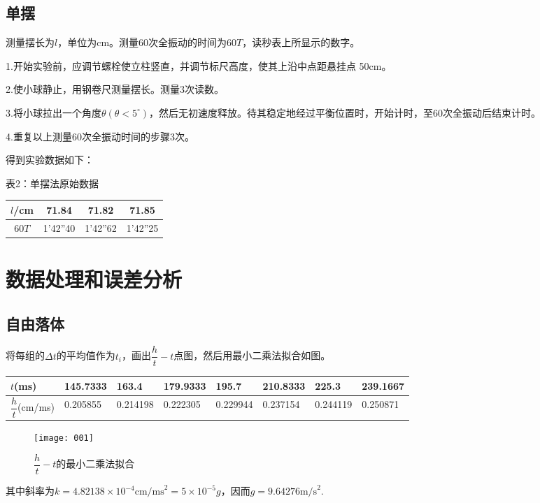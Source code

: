 \documentclass[11pt]{article}
\begin{document}
\subsection{单摆}
测量摆长为$ l $，单位为cm。测量60次全振动的时间为$ 60T $，读秒表上所显示的数字。

1.开始实验前，应调节螺栓使立柱竖直，并调节标尺高度，使其上沿中点距悬挂点 50cm。

2.使小球静止，用钢卷尺测量摆长。测量3次读数。

3.将小球拉出一个角度$ \theta(\theta <5^\circ) $，然后无初速度释放。待其稳定地经过平衡位置时，开始计时，至60次全振动后结束计时。

4.重复以上测量60次全振动时间的步骤3次。

得到实验数据如下：
\begin{center}
	表2：单摆法原始数据
		\begin{tabular}{|c|c|c|c|}
			\hline
			$ l $/cm & 71.84    & 71.82    & 71.85    \\ \hline
			$ 60T $  & 1'42''40 & 1'42''62 & 1'42''25 \\ \hline
		\end{tabular}
\end{center}
\section{数据处理和误差分析}
\subsection{自由落体}
将每组的$ \Delta t $的平均值作为$ t_i $，画出$ \dfrac{h}{t}-t $点图，然后用最小二乘法拟合如图。
\begin{center}
		\begin{tabular}{|l|l|l|l|l|l|l|l|}
			\hline
			$ t $(ms) & 145.7333 & 163.4    & 179.9333 & 195.7    & 210.8333 & 225.3    & 239.1667 \\ \hline
			$ \dfrac{h}{t} $(cm/ms) & 0.205855 & 0.214198 & 0.222305 & 0.229944 & 0.237154 & 0.244119 & 0.250871 \\ \hline
		\end{tabular}
\end{center}
\begin{figure}[htbp]
	\centering
	\texttt{[image: 001]}
	\caption{$ \dfrac{h}{t}-t $的最小二乘法拟合}
	\label{fig:001}
\end{figure}
其中斜率为$ k=4.82138\times 10^{-4} \text{cm/ms}^2=5\times 10^{-5} g$，因而$ g=9.64276\text{m/s}^2 $.
\end{document}
